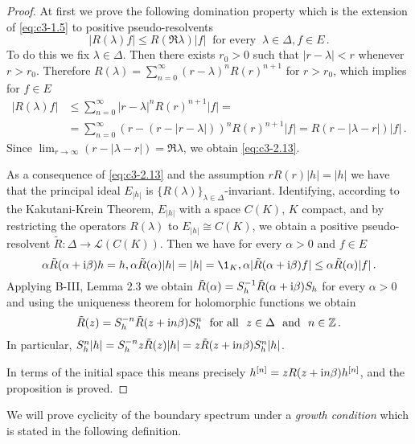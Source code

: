 \begin{proof}
At first we prove the following domination property which is the extension of \eqref{eq:c3-1.5} to positive pseudo-resolvents
\begin{equation}\label{eq:c3-2.13}
	|R(\lambda)f| \leq R(\Re  \lambda) |f| \ \text{ for every } \ \lambda \in \Delta , f \in E\,.
\end{equation}
To do this we fix $\lambda \in \Delta$.
Then there exists $r_{0} > 0$ such that $|r-\lambda| < r$ whenever $r > r_{0}$.
Therefore $R(\lambda) = \sum_{n=0}^{\infty}(r-\lambda)^{n}R(r)^{n+1}$ for $r > r_{0}$, which implies for $f \in E$
\begin{align*}
	|R(\lambda)f| &\leq \sum_{n=0}^{\infty}|r-\lambda|^{n}R(r)^{n+1}|f| = \\
	& =\sum_{n=0}^{\infty}(r - (r-|r-\lambda|))^{n}R(r)^{n+1}|f| = R(r - |\lambda-r|) |f|\,.
\end{align*}
Since $\lim_{r \to \infty} (r - |\lambda-r|) = \Re  \lambda$, we obtain \eqref{eq:c3-2.13}.

As a consequence of \eqref{eq:c3-2.13} and the assumption $rR(r) |h| = |h|$ we have that the principal ideal $E_{|h|}$ is $\{R(\lambda)\}_{\lambda \in \Delta}$-invariant.
Identifying, according to the Kakutani-Krein Theorem, $E_{|h|}$ with a space $C(K)$, $K$ compact, and by restricting the operators $R(\lambda)$ to $E_{|h|} \cong C(K)$, we obtain a positive pseudo-resolvent $\tilde{R} \colon \Delta \to \mathcal{L}(C(K))$.
Then we have for every $\alpha > 0$ and $f \in E$
\[
\alpha\tilde{R}(\alpha+\im\beta)h = h, \alpha\tilde{R}(\alpha) |h| = |h| = \1_{K}, \alpha|\tilde{R}(\alpha+\im\beta)f| \leq \alpha\tilde{R}(\alpha) |f|\,.
\]
Applying B-III, Lemma 2.3 we obtain $\tilde{R}(\alpha) = S_{h}^{-1}\tilde{R}(\alpha + \mathrm{i}\beta)S_{h}$ for every $\alpha > 0$ and using the uniqueness theorem for holomorphic functions we obtain
\begin{equation}\label{eq:c3-2.14}
\tilde{R}(z) = S_{h}^{-n}\tilde{R}(z + \mathrm{i} n\beta)S_{h}^{n} \ \text{ for all } \ z \in \Delta \ \text{ and } \ n \in \mathbb{Z}\,.
\end{equation}
In particular, $S_{h}^{n}|h| = S_{h}^{-n}z\tilde{R}(z) |h| = z\tilde{R}(z+\mathrm{i} n\beta)S_{h}^{n}|h|$.

In terms of the initial space this means precisely $h^{[n]} = zR(z+\mathrm{i} n\beta)h^{[n]}$, and the proposition is proved.
\end{proof}
We will prove cyclicity of the boundary spectrum under a \emph{growth condition} which is stated in the following definition.

